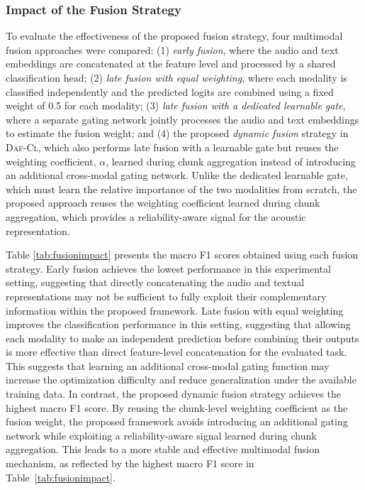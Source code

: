 \subsubsection{Impact of the Fusion Strategy}

To evaluate the effectiveness of the proposed fusion strategy, four multimodal fusion approaches were compared: (1) \textit{early fusion}, where the audio and text embeddings are concatenated at the feature level and processed by a shared classification head; (2) \textit{late fusion with equal weighting}, where each modality is classified independently and the predicted logits are combined using a fixed weight of 0.5 for each modality; (3) \textit{late fusion with a dedicated learnable gate}, where a separate gating network jointly processes the audio and text embeddings to estimate the fusion weight; and (4) the proposed \textit{dynamic fusion} strategy in \textsc{Daf-Cl}, which also performs late fusion with a learnable gate but reuses the weighting coefficient, $\alpha$, learned during chunk aggregation instead of introducing an additional cross-modal gating network. Unlike the dedicated learnable gate, which must learn the relative importance of the two modalities from scratch, the proposed approach reuses the weighting coefficient learned during chunk aggregation, which provides a reliability-aware signal for the acoustic representation.

Table \ref{tab:fusionimpact} presents the macro F1 scores obtained using each fusion strategy. Early fusion achieves the lowest performance in this experimental setting, suggesting that directly concatenating the audio and textual representations may not be sufficient to fully exploit their complementary information within the proposed framework. Late fusion with equal weighting improves the classification performance in this setting, suggesting that allowing each modality to make an independent prediction before combining their outputs is more effective than direct feature-level concatenation for the evaluated task. This suggests that learning an additional cross-modal gating function may increase the optimization difficulty and reduce generalization under the available training data. In contrast, the proposed dynamic fusion strategy achieves the highest macro F1 score. By reusing the chunk-level weighting coefficient as the fusion weight, the proposed framework avoids introducing an additional gating network while exploiting a reliability-aware signal learned during chunk aggregation. This leads to a more stable and effective multimodal fusion mechanism, as reflected by the highest macro F1 score in Table~\ref{tab:fusionimpact}.

